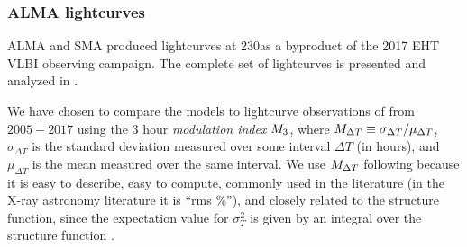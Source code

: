 
\subsubsection{ALMA lightcurves}


ALMA and SMA produced \sgra lightcurves at 230\GHz as a byproduct of the 2017 EHT VLBI observing campaign. The complete set of lightcurves is presented and analyzed in \cite{Wielgus2022}.

We have chosen to compare the models to lightcurve observations of \sgra from $2005-2017$ using the 3 hour {\em modulation index} $M_{3}$, where $M_{\Delta T} \equiv \sigma_{\Delta T}/\mu_{\Delta T}$, $\sigma_{\Delta T}$ is the standard deviation measured over some interval $\Delta T$ (in hours), and $\mu_{\Delta T}$ is the mean measured over the same interval.  We use $M_{\Delta T}$ following \citet{2015ApJ...812..103C} because it is easy to describe, easy to compute, commonly used in the literature (in the X-ray astronomy literature it is ``rms \%''), and closely related to the structure function, since the expectation value for $\sigma_T^2$ is given by an integral over the structure function \citep[see][]{Lee_2022}.

